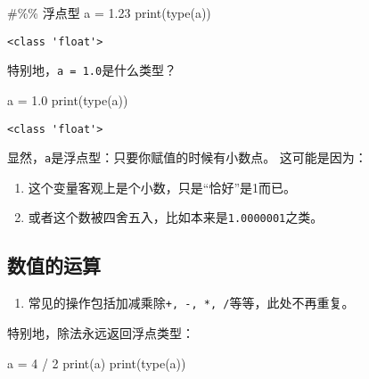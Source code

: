 \documentclass[
  letterpaper,
  DIV=11,
  numbers=noendperiod]{scrreprt}
\newenvironment{Shaded}{\begin{snugshade}}{\end{snugshade}}
\newcommand{\BuiltInTok}[1]{\textcolor[rgb]{0.00,0.23,0.31}{#1}}
\newcommand{\CommentTok}[1]{\textcolor[rgb]{0.37,0.37,0.37}{#1}}
\newcommand{\DecValTok}[1]{\textcolor[rgb]{0.68,0.00,0.00}{#1}}
\newcommand{\FloatTok}[1]{\textcolor[rgb]{0.68,0.00,0.00}{#1}}
\newcommand{\NormalTok}[1]{\textcolor[rgb]{0.00,0.23,0.31}{#1}}
\newcommand{\OperatorTok}[1]{\textcolor[rgb]{0.37,0.37,0.37}{#1}}
\providecommand{\tightlist}{%
  \setlength{\itemsep}{0pt}\setlength{\parskip}{0pt}}\usepackage{longtable,booktabs,array}
\begin{document}
\begin{Shaded}
\begin{Highlighting}[]
\CommentTok{\#\%\% 浮点型}
\NormalTok{a }\OperatorTok{=} \FloatTok{1.23}
\BuiltInTok{print}\NormalTok{(}\BuiltInTok{type}\NormalTok{(a))}
\end{Highlighting}
\end{Shaded}

\begin{verbatim}
<class 'float'>
\end{verbatim}

特别地，\texttt{a\ =\ 1.0}是什么类型？

\begin{Shaded}
\begin{Highlighting}[]
\NormalTok{a }\OperatorTok{=} \FloatTok{1.0}
\BuiltInTok{print}\NormalTok{(}\BuiltInTok{type}\NormalTok{(a))}
\end{Highlighting}
\end{Shaded}

\begin{verbatim}
<class 'float'>
\end{verbatim}

显然，\texttt{a}是浮点型：只要你赋值的时候有小数点。 这可能是因为：

\begin{enumerate}
\def\labelenumi{\arabic{enumi}.}
\tightlist
\item
  这个变量客观上是个小数，只是``恰好''是1而已。
\item
  或者这个数被四舍五入，比如本来是\texttt{1.0000001}之类。
\end{enumerate}

\hypertarget{ux6570ux503cux7684ux8fd0ux7b97}{%
\subsection{数值的运算}\label{ux6570ux503cux7684ux8fd0ux7b97}}

\begin{enumerate}
\def\labelenumi{\arabic{enumi}.}
\tightlist
\item
  常见的操作包括加减乘除\texttt{+,\ -,\ *,\ /}等等，此处不再重复。
\end{enumerate}

特别地，除法永远返回浮点类型：

\begin{Shaded}
\begin{Highlighting}[]
\NormalTok{a }\OperatorTok{=} \DecValTok{4} \OperatorTok{/} \DecValTok{2}
\BuiltInTok{print}\NormalTok{(a)}
\BuiltInTok{print}\NormalTok{(}\BuiltInTok{type}\NormalTok{(a))}
\end{Highlighting}
\end{Shaded}
\end{document}
